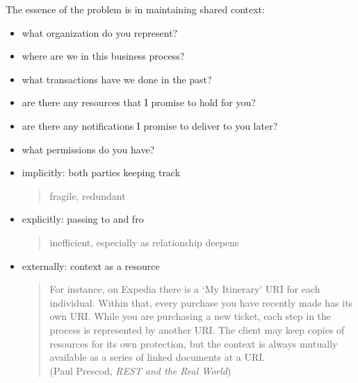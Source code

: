 \documentclass{sepslide-soa-faked} %
\begin{document}
\begin{slide}
The essence of the problem is in maintaining shared context:
\begin{itemize}
    \item what organization do you represent?
    \item where are we in this business process?
    \item what transactions have we done in the past?
    \item are there any resources that I promise to hold for you?
    \item are there any notifications I promise to deliver to you later?
    \item what permissions do you have?
\end{itemize}
\end{slide}

\begin{slide}
\begin{itemize}
\item implicitly: both parties keeping track
\begin{quote}
fragile, redundant
\end{quote}
\item explicitly: passing to and fro
\begin{quote}
inefficient, especially as relationship deepens
\end{quote}
\item externally: context as a resource
\begin{quote}
{\sffamily
For instance, on Expedia there is a `My Itinerary' URI for each individual. Within that, every purchase you have recently made has its own URI. While you are purchasing a new ticket, each step in the process is represented by another URI. The client may keep copies of resources for its own protection, but the context is always mutually available as a series of linked documents at a URI.
} \medskip \\
(Paul Prescod, \textit{REST and the Real World})
\end{quote}
\end{itemize}
\end{slide}
\end{document}
